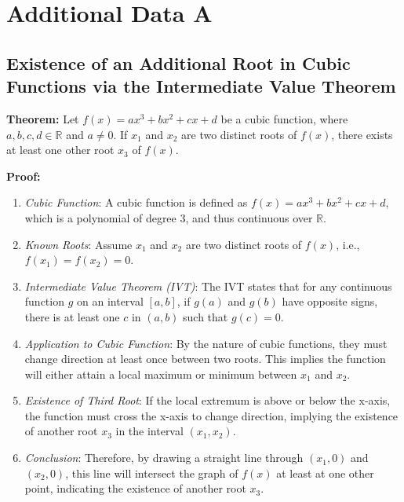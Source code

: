 \chapter{Additional Data A}

\section{Existence of an Additional Root in Cubic Functions via the Intermediate Value Theorem}

\textbf{Theorem:} Let \( f(x) = ax^3 + bx^2 + cx + d \) be a cubic function, where \( a, b, c, d \in \mathbb{R} \) and \( a \neq 0 \). If \( x_1 \) and \( x_2 \) are two distinct roots of \( f(x) \), there exists at least one other root \( x_3 \) of \( f(x) \).

\textbf{Proof:}

\begin{enumerate}
	\item \textit{Cubic Function}: A cubic function is defined as \( f(x) = ax^3 + bx^2 + cx + d \), which is a polynomial of degree 3, and thus continuous over \(\mathbb{R}\).
	
	\item \textit{Known Roots}: Assume \( x_1 \) and \( x_2 \) are two distinct roots of \( f(x) \), i.e., \( f(x_1) = f(x_2) = 0 \).
	
	\item \textit{Intermediate Value Theorem (IVT)}: The IVT states that for any continuous function \( g \) on an interval \([a, b]\), if \( g(a) \) and \( g(b) \) have opposite signs, there is at least one \( c \) in \((a, b)\) such that \( g(c) = 0 \).
	
	\item \textit{Application to Cubic Function}: By the nature of cubic functions, they must change direction at least once between two roots. This implies the function will either attain a local maximum or minimum between \( x_1 \) and \( x_2 \).
	
	\item \textit{Existence of Third Root}: If the local extremum is above or below the x-axis, the function must cross the x-axis to change direction, implying the existence of another root \( x_3 \) in the interval \((x_1, x_2)\).
	
	\item \textit{Conclusion}: Therefore, by drawing a straight line through \( (x_1, 0) \) and \( (x_2, 0) \), this line will intersect the graph of \( f(x) \) at least at one other point, indicating the existence of another root \( x_3 \).
\end{enumerate}

